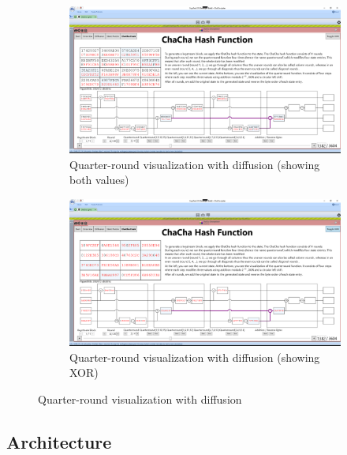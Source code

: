 \begin{figure}
\begin{subfigure}[t]{\textwidth}
  \centering
  \includegraphics[width=\textwidth]{figures/ct2/chachahash/chachahash-mid-qr-diffusion.png}
  \caption{Quarter-round visualization with diffusion (showing both values)}
  \label{fig:chachahash.mid.qr.diffusion.both}
\end{subfigure}
\begin{subfigure}[t]{\textwidth}
  \centering
  \includegraphics[width=\textwidth]{figures/ct2/chachahash/chachahash-mid-qr-diffusion-xor.png}
  \caption{Quarter-round visualization with diffusion (showing XOR)}
  \label{fig:chachahash.mid.qr.diffusion.xor}
\end{subfigure}
\caption{Quarter-round visualization with diffusion}
\label{fig:chachahash.mid.qr.diffusion}
\end{figure}



\FloatBarrier
\subsection{Architecture}
\label{sec:Architecture}

